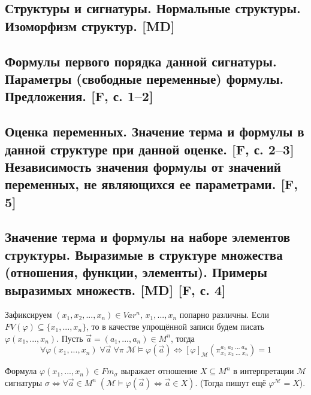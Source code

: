 \documentclass[a4paper, fleqn]{article}
\begin{document}
    \subsection{Структуры и сигнатуры. Нормальные структуры. Изоморфизм структур. [MD]}

    \subsection{Формулы первого порядка данной сигнатуры. Параметры (свободные переменные) формулы. Предложения. [F, с. 1–2]}

    \subsection{Оценка переменных. Значение терма и формулы в данной структуре при данной оценке. [F, с. 2–3] Независимость значения формулы от значений переменных, не являющихся ее параметрами. [F, 5]}

    \subsection{Значение терма и формулы на наборе элементов структуры. Выразимые в структуре множества (отношения, функции, элементы). Примеры выразимых множеств. [MD] [F, с. 4]}
    \begin{proposition}
        Зафиксируем $(x_1, x_2, ..., x_n) \in Var^n$, $x_1, ..., x_n$ попарно различны. Если $FV(\varphi) \subseteq \{x_1, ..., x_n\}$, то в качестве упрощённой записи будем писать $\varphi(x_1, ..., x_n)$. Пусть $\overrightarrow{a} = (a_1, ..., a_n) \in M^n$, тогда
        $$\forall \varphi(x_1, ..., x_n) \; \forall \overrightarrow{a} \; \forall \mathcal{\pi} \; \mathcal{M} \vDash \varphi(\overrightarrow{a}) \Leftrightarrow [\varphi]_{\mathcal{M}} (\pi_{x_1 \; x_2 \; ... \; x_n}^{a_1 \; a_2 \; ... \; a_n}) = 1$$
    \end{proposition}

    \begin{definition}
        Формула $\varphi(x_1, ..., x_n) \in Fm_{\sigma}$ выражает отношение $X \subseteq M^n$ в интерпретации $\mathcal{M}$ сигнатуры $\sigma \Leftrightarrow \forall \overrightarrow{a} \in M^n \; (\mathcal{M} \vDash \varphi(\overrightarrow{a}) \Leftrightarrow \overrightarrow{a} \in X)$. (Тогда пишут ещё $\varphi^{\mathcal{M}} = X$).
    \end{definition}
\end{document}

